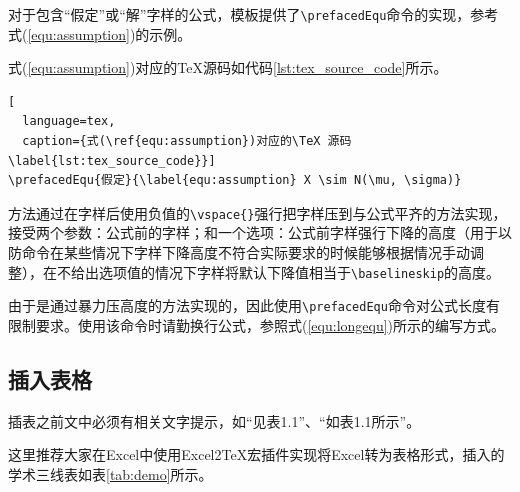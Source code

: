 对于包含“假定”或“解”字样的公式，模板提供了\texttt{\textbackslash prefacedEqu}命令的实现，参考式(\ref{equ:assumption})的示例。


式(\ref{equ:assumption})对应的\TeX 源码如代码\ref{lst:tex_source_code}所示。

\begin{lstlisting}[
  language=tex, 
  caption={式(\ref{equ:assumption})对应的\TeX 源码\label{lst:tex_source_code}}]
\prefacedEqu{假定}{\label{equ:assumption} X \sim N(\mu, \sigma)}
\end{lstlisting}

方法通过在字样后使用负值的\texttt{\textbackslash vspace\{\}}强行把字样压到与公式平齐的方法实现，接受两个参数：公式前的字样；和一个选项：公式前字样强行下降的高度（用于以防命令在某些情况下字样下降高度不符合实际要求的时候能够根据情况手动调整），在不给出选项值的情况下字样将默认下降值相当于\texttt{\textbackslash baselineskip}的高度。

由于是通过暴力压高度的方法实现的，因此使用\texttt{\textbackslash prefacedEqu}命令对公式长度有限制要求。使用该命令时请勤换行公式，参照式(\ref{equ:longequ})所示的编写方式。


\subsection{插入表格}

插表之前文中必须有相关文字提示，如“见表1.1”、“如表1.1所示”。

这里推荐大家在Excel中使用Excel2TeX宏插件实现将Excel转为表格形式，插入的学术三线表如表\ref{tab:demo}所示。

